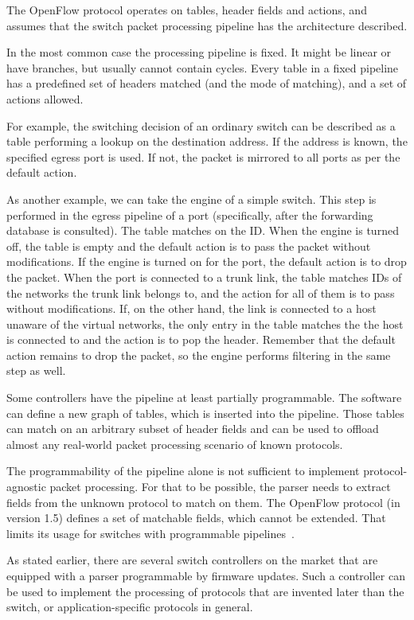 The OpenFlow protocol operates on tables, header fields and actions, and
assumes that the switch packet
processing pipeline has the architecture described.

In the most common case the processing pipeline is fixed. It might be
linear or have branches, but usually cannot contain cycles. Every table in
a fixed pipeline has a predefined set of headers matched (and the mode of
matching), and a set of actions allowed.

For example, the switching decision of an ordinary switch can be described as a table
performing a lookup on the destination  address. If the address is known,
the specified egress port is used. If not, the packet is mirrored to all
ports as per the default action.

As another example, we can take the  engine of a simple switch. This step
is performed in the egress pipeline of a port (specifically, after the forwarding database
is consulted). The table matches on the  ID. When the engine is turned
off, the table is empty and the default action is to pass the packet without
modifications. If the engine is turned on for the port, the default action is
to drop the packet. When the port is connected to a trunk link, the table matches
 IDs of the networks the trunk link belongs to, and the action for
all of them is to pass without modifications. If, on the other hand, the link is
connected to a host unaware of the virtual networks, the only entry in the table
matches the  the host is connected to and the action is to pop the 
header. Remember that the default action remains to drop the packet, so the
engine performs filtering in the same step as well.

Some controllers have the pipeline at least partially programmable.
The software can define a new graph of tables, which is inserted into the
pipeline. Those tables can match on an arbitrary subset of header fields and can be
used to offload almost any real-world packet processing scenario of known
protocols.

The programmability of the pipeline alone is not sufficient to implement
protocol-agnostic packet processing. For that to be possible, the parser needs
to extract fields from the unknown protocol to match on them. The OpenFlow
protocol (in version 1.5) defines a set of matchable fields, which
cannot be extended. That limits its usage for switches with programmable
pipelines~\cite{openflow}.

As stated earlier, there are several switch controllers on the market that are
equipped with a parser programmable by firmware updates. Such a controller can be
used to implement the processing of protocols that are invented later than the
switch, or application-specific protocols in general.

